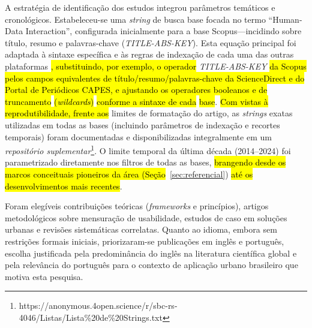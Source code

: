 \documentclass[12pt]{article}
\begin{document}
    A estratégia de identificação dos estudos integrou parâmetros temáticos e cronológicos. Estabeleceu-se uma \textit{string} de busca base focada no termo ``Human-Data Interaction'', configurada inicialmente para a base Scopus---incidindo sobre título, resumo e palavras-chave (\textit{TITLE-ABS-KEY}). Esta equação principal foi adaptada à sintaxe específica e às regras de indexação de cada uma das outras plataformas \hl{, substituindo, por exemplo, o operador} \textit{TITLE-ABS-KEY} \hl{da Scopus pelos campos equivalentes de título/resumo/palavras-chave da ScienceDirect e do Portal de Periódicos CAPES, e ajustando os operadores booleanos e de truncamento} \hl{(\textit{wildcards})} \hl{conforme a sintaxe de cada} \hl{base}. \hl{Com vistas à reprodutibilidade, frente aos} limites de formatação do artigo, as \textit{strings} exatas utilizadas em todas as bases (incluindo parâmetros de indexação e recortes temporais) foram documentadas e disponibilizadas integralmente em um \emph{repositório suplementar}\footnote{https://anonymous.4open.science/r/sbc-rs-4046/Listas/Lista\%20de\%20Strings.txt}. O limite temporal da última década (2014--2024) foi parametrizado diretamente nos filtros de todas as bases, \hl{brangendo desde os marcos conceituais pioneiros da área (Seção}~\ref{sec:referencial}) \hl{até os desenvolvimentos mais recentes}.

    Foram elegíveis contribuições teóricas (\textit{frameworks} e princípios), artigos metodológicos sobre mensuração de usabilidade, estudos de caso em soluções urbanas e revisões sistemáticas correlatas. Quanto ao idioma, embora sem restrições formais iniciais, priorizaram-se publicações em inglês e português, escolha justificada pela predominância do inglês na literatura científica global e pela relevância do português para o contexto de aplicação urbano brasileiro que motiva esta pesquisa.
    
\end{document}
